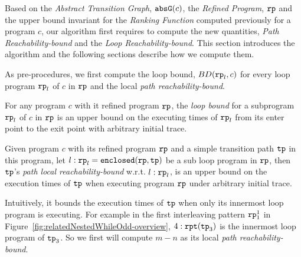 Based on the \emph{Abstract Transition Graph}, $\mathtt{abs}{\mathtt{G}}(c)$, the \emph{Refined Program}, $\mathtt{rp}$ and the upper bound invariant for the \emph{Ranking Function} computed previously for a program $c$, our algorithm first requires to compute the new quantities, \emph{Path Reachability-bound} and the \emph{Loop Reachability-bound}. This section introduces the algorithm and the following sections describe how we compute them.

As pre-procedures, we first compute the loop bound, $BD(\mathtt{rp}_l, c)$ for every loop program $\mathtt{rp}_l$ of $c$ in $\mathtt{rp}$ and the local \emph{path reachability-bound}.
\begin{defn}
  For any program $c$ with it refined program $\mathtt{rp}$,
  the \emph{loop bound}
  for a subprogram $\mathtt{rp}_l$ of $c$ in $\mathtt{rp}$ is an upper bound on the executing times of $\mathtt{rp}_l$ from its enter point to the exit point with arbitrary initial trace.
\end{defn}
% 
\begin{defn}
  Given program $c$ with its refined program $\mathtt{rp}$ and a simple transition path $\mathtt{tp}$ in this program, 
  let $l: \mathtt{rp}_l = \mathtt{enclosed}(\mathtt{rp}, \mathtt{tp})$ be a sub loop program in $\mathtt{rp}$,
  then $\mathtt{tp}$'s \emph{path local reachability-bound} w.r.t. $l: \mathtt{rp}_l$, 
  is an upper bound on the execution times of $\mathtt{tp}$ when executing program $\mathtt{rp}$ under arbitrary initial trace.
\end{defn}
Intuitively, it bounds the execution times of $\mathtt{tp}$ when only its innermost loop program is executing.
For example in the first interleaving pattern $\mathtt{rp}_1^1$ in Figure~\ref{fig:relatedNestedWhileOdd-overview}, 
$4:\mathtt{rpt}(\mathtt{tp}_3)$ is the innermost loop program of $\mathtt{tp}_3$.
So we first will compute $m - n$ as its local \emph{path reachability-bound}.

